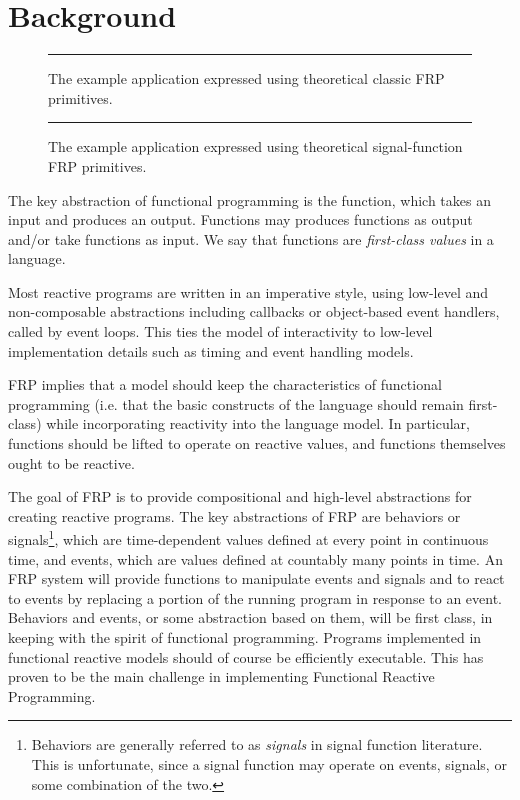 \section{Background}
\label{section:Background}


\begin{figure}

\hrule

\caption{The example application expressed using theoretical classic FRP primitives.}
\label{figure:classic-frp-example}
\end{figure}



\begin{figure}

\hrule

\caption{The example application expressed using theoretical signal-function FRP primitives.}
\label{figure:sf-frp-example}
\end{figure}

The key abstraction of functional programming is the function, which takes an input and produces an output. Functions may produces functions
as output and/or take functions as input. We say that functions are {\em first-class values} in a language.

Most reactive programs are written in an imperative style, using low-level and non-composable abstractions including callbacks
or object-based event handlers, called by event loops. This ties the model of interactivity to low-level implementation details such as timing and event handling models. 

FRP implies that a model should keep the characteristics of functional programming (i.e. that the basic constructs of the language
should remain first-class) while incorporating reactivity into the language model. In particular, functions should be lifted to operate on reactive values,
and functions themselves ought to be reactive.

The goal of FRP is to provide compositional and high-level abstractions for creating reactive programs. The key
abstractions of FRP are behaviors or signals\footnote{Behaviors are generally referred to as {\em signals} in signal function literature. This is unfortunate, since a signal
function may operate on events, signals, or some combination of the two.}, which are time-dependent values defined at every point in continuous time, and events, which are 
values defined at countably many points in time. An FRP system will provide functions to manipulate events and signals and to react
to events by replacing a portion of the running program in response to an event. Behaviors and events, or some abstraction
based on them, will be first class, in keeping with the spirit of functional programming. Programs implemented in functional reactive
models should of course be efficiently executable. This has proven to be the main challenge in implementing Functional Reactive Programming.

